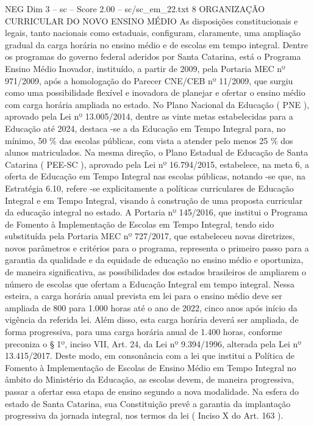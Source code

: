 \begin{textsample}{NEG Dim 3 – sc – Score 2.00 – sc/sc\_em\_22.txt}  \label{ex:f3_neg_229}
8 ORGANIZAÇÃO CURRICULAR DO NOVO ENSINO MÉDIO As disposições constitucionais e legais, tanto nacionais como estaduais, configuram, claramente, uma ampliação gradual da carga horária no ensino médio e de escolas em tempo integral.
Dentre os programas do governo federal aderidos por Santa Catarina, está o Programa Ensino Médio Inovador, instituído, a partir de 2009, pela Portaria MEC nº 971/2009, após a homologação do Parecer CNE/CEB nº 11/2009, que surgiu como uma possibilidade flexível e inovadora de planejar e ofertar o ensino médio com carga horária ampliada no estado.
No Plano Nacional da Educação ( PNE ), aprovado pela Lei nº 13.005/2014, dentre as vinte metas estabelecidas para a Educação até 2024, destaca -se a da Educação em Tempo Integral para, no mínimo, 50 \% das escolas públicas, com vista a atender pelo menos 25 \% dos alunos matriculados.
Na mesma direção, o Plano Estadual de Educação de Santa Catarina ( PEE-SC ), aprovado pela Lei nº 16.794/2015, estabelece, na meta 6, a oferta de Educação em Tempo Integral nas escolas públicas, notando -se que, na Estratégia 6.10, refere -se explicitamente a políticas curriculares de Educação Integral e em Tempo Integral, visando à construção de uma proposta curricular da educação integral no estado.
A Portaria nº 145/2016, que institui o Programa de Fomento à Implementação de Escolas em Tempo Integral, tendo sido substituída pela Portaria MEC nº 727/2017, que estabeleceu novas diretrizes, novos parâmetros e critérios para o programa, representa o primeiro passo para a garantia da qualidade e da equidade de educação no ensino médio e oportuniza, de maneira significativa, as possibilidades dos estados brasileiros de ampliarem o número de escolas que ofertam a Educação Integral em tempo integral.
Nessa esteira, a carga horária anual prevista em lei para o ensino médio deve ser ampliada de 800 para 1.000 horas até o ano de 2022, cinco anos após início da vigência da referida lei.
Além disso, esta carga horária deverá ser ampliada, de forma progressiva, para uma carga horária anual de 1.400 horas, conforme preconiza o § 1º, inciso VII, Art. 24, da Lei nº 9.394/1996, alterada pela Lei nº 13.415/2017.
Deste modo, em consonância com a lei que institui a Política de Fomento à Implementação de Escolas de Ensino Médio em Tempo Integral no âmbito do Ministério da Educação, as escolas devem, de maneira progressiva, passar a ofertar essa etapa de ensino segundo a nova modalidade.
Na esfera do estado de Santa Catarina, sua Constituição prevê a garantia da implantação progressiva da jornada integral, nos termos da lei ( Inciso X do Art. 163 ).

\end{textsample}
